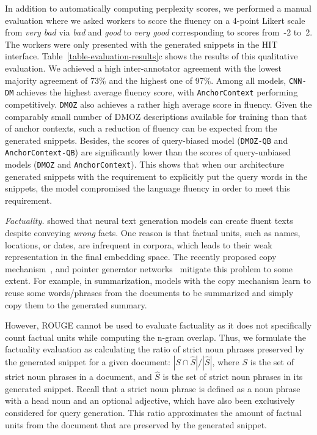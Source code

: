 \documentclass[sigconf]{acmart}
\newcommand{\bslabel}[1]{\textsl{#1.}}
\begin{document}
 
In addition to automatically computing perplexity scores, we performed a manual evaluation where we asked workers to score the fluency on a 4-point Likert scale from \emph{very bad} via \emph{bad} and \emph{good} to \emph{very good} corresponding to scores from~-2 to~2. The workers were only presented with the generated snippets in the HIT interface. Table~\ref{table-evaluation-results}c shows the results of this qualitative evaluation. We achieved a high inter-annotator agreement with the lowest majority agreement of 73\%  and the highest one of 97\%. Among all models, {\small\tt CNN-DM} achieves the highest average fluency score, with {\small\tt AnchorContext} performing competitively. {\small\tt DMOZ} also achieves a rather high average score in fluency. Given the comparably small number of DMOZ descriptions available for training than that of anchor contexts, such a reduction of fluency can be expected from the generated snippets. Besides, the scores of query-biased model ({\small\tt DMOZ-QB} and {\small\tt AnchorContext-QB}) are significantly lower than the scores of query-unbiased models ({\small\tt DMOZ} and {\small\tt AnchorContext}). This shows that when our architecture generated snippets with the requirement to explicitly put the query words in the snippets, the model compromised the language fluency in order to meet this requirement.

\bslabel{Factuality}
\citet{cao:2018} showed that neural text generation models can create fluent texts despite conveying \emph{wrong} facts. One reason is that factual units, such as names, locations, or dates, are infrequent in corpora, which leads to their weak representation in the final embedding space. The recently proposed copy mechanism~\cite{gu:2016}, and pointer generator networks~\cite{see:2017} mitigate this problem to some extent. For example, in summarization, models with the copy mechanism learn to reuse some words/phrases from the documents to be summarized and simply copy them to the generated summary.

However, ROUGE cannot be used to evaluate factuality as it does not specifically count factual units while computing the n-gram overlap. Thus, we formulate the factuality evaluation as calculating the ratio of strict noun phrases preserved by the generated snippet for a given document: $|S \cap \hat{S}|/|\hat{S}|$, where $S$ is the set of strict noun phrases in a document, and $\hat{S}$ is the set of strict noun phrases in its generated snippet. Recall that a strict noun phrase is defined as a noun phrase with a head noun and an optional adjective, which have also been exclusively considered for query generation. This ratio approximates the amount of factual units from the document that are preserved by the generated snippet.
\end{document}
